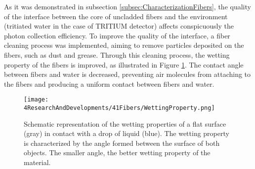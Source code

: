 
As it was demonstrated in subsection \ref{subsec:CharacterizationFibers}, the quality of the interface between the core of uncladded fibers and the environment (tritiated water in the case of TRITIUM detector) affects conspicuously the photon collection efficiency. To improve the quality of the interface, a fiber cleaning process was implemented, aiming to remove particles deposited on the fibers, such as dust and grease.  Through this cleaning process, the wetting property of the fibers is improved, as illustrated in Figure \ref{fig:WettingProperty}. The contact angle between fibers and water is decreased, preventing air molecules from attaching to the fibers and producing a uniform contact between fibers and water.
\begin{figure}[h]
\centering
\texttt{[image: 4ResearchAndDevelopments/41Fibers/WettingProperty.png]}
\caption{Schematic representation of the wetting properties of a flat surface (gray) in contact with a drop of liquid (blue). The wetting property is characterized by the angle formed between the surface of both objects. The smaller angle, the better wetting property of the material. \cite{WettingProperty}\label{fig:WettingProperty}}
\end{figure}
